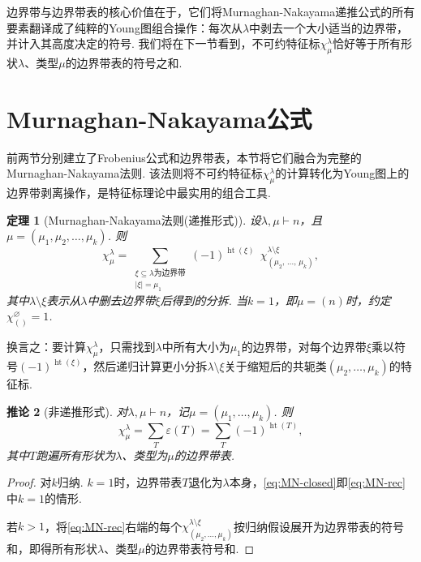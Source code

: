\documentclass{sjtureport}
\newtheorem{theorem}{定理}[chapter]
\newtheorem{corollary}[theorem]{推论}
\begin{document}
\medskip
边界带与边界带表的核心价值在于，它们将Murnaghan-Nakayama递推公式的所有要素翻译成了纯粹的Young图组合操作：每次从$\lambda$中剥去一个大小适当的边界带，并计入其高度决定的符号. 我们将在下一节看到，不可约特征标$\chi^\lambda_\mu$恰好等于所有形状$\lambda$、类型$\mu$的边界带表的符号之和. 


\section{Murnaghan-Nakayama公式}

前两节分别建立了Frobenius公式和边界带表，本节将它们融合为完整的Murnaghan-Nakayama法则. 该法则将不可约特征标$\chi^\lambda_\mu$的计算转化为Young图上的边界带剥离操作，是特征标理论中最实用的组合工具. 

\begin{theorem}[Murnaghan-Nakayama法则(递推形式)]\label{thm:MN}
    设$\lambda,\mu\vdash n$，且$\mu=(\mu_1,\mu_2,\dots,\mu_k)$. 则
    \begin{equation}\label{eq:MN-rec}
        \chi^\lambda_\mu = \sum_{\substack{\xi\subseteq\lambda\text{为边界带}\\|\xi|=\mu_1}} (-1)^{\operatorname{ht}(\xi)}\;\,
        \chi^{\lambda\setminus\xi}_{(\mu_2,\,\dots,\,\mu_k)},
    \end{equation}
    其中$\lambda\setminus\xi$表示从$\lambda$中删去边界带$\xi$后得到的分拆. 当$k=1$，即$\mu=(n)$时，约定$\chi^{\varnothing}_{()}=1$. 
\end{theorem}

换言之：要计算$\chi^\lambda_\mu$，只需找到$\lambda$中所有大小为$\mu_1$的边界带，对每个边界带$\xi$乘以符号$(-1)^{\operatorname{ht}(\xi)}$，然后递归计算更小分拆$\lambda\setminus\xi$关于缩短后的共轭类$(\mu_2,\dots,\mu_k)$的特征标. 

\begin{corollary}[非递推形式]\label{cor:MN-closed}
    对$\lambda,\mu\vdash n$，记$\mu=(\mu_1,\dots,\mu_k)$. 则
    \begin{equation}\label{eq:MN-closed}
        \chi^\lambda_\mu = \sum_{T} \varepsilon(T) = \sum_{T} (-1)^{\operatorname{ht}(T)},
    \end{equation}
    其中$T$跑遍所有形状为$\lambda$、类型为$\mu$的边界带表. 
\end{corollary}
\begin{proof}
    对$k$归纳. $k=1$时，边界带表$T$退化为$\lambda$本身，\eqref{eq:MN-closed}即\eqref{eq:MN-rec}中$k=1$的情形.\par
    若$k>1$，将\eqref{eq:MN-rec}右端的每个$\chi^{\lambda\setminus\xi}_{(\mu_2,\dots,\mu_k)}$按归纳假设展开为边界带表的符号和，即得所有形状$\lambda$、类型$\mu$的边界带表符号和. 
\end{proof}
\end{document}
